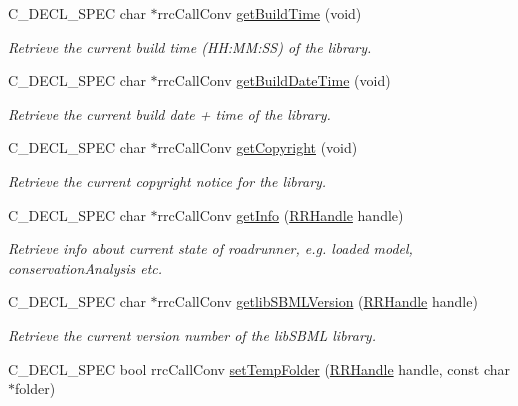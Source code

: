 \begin{DoxyCompactItemize}
C\+\_\+\+D\+E\+C\+L\+\_\+\+S\+P\+E\+C char $\ast$rrc\+Call\+Conv \hyperlink{group__utility_ga13bdcd39aaa18268a31afc060417437d}{get\+Build\+Time} (void)
\begin{DoxyCompactList}\small\item\em Retrieve the current build time (H\+H\+:\+M\+M\+:S\+S) of the library. \end{DoxyCompactList}\item 
C\+\_\+\+D\+E\+C\+L\+\_\+\+S\+P\+E\+C char $\ast$rrc\+Call\+Conv \hyperlink{group__utility_ga53e63bf5237b8e8839c5dd1fd5607e43}{get\+Build\+Date\+Time} (void)
\begin{DoxyCompactList}\small\item\em Retrieve the current build date + time of the library. \end{DoxyCompactList}\item 
C\+\_\+\+D\+E\+C\+L\+\_\+\+S\+P\+E\+C char $\ast$rrc\+Call\+Conv \hyperlink{group__utility_ga909790f456d1a032049c75013814edd2}{get\+Copyright} (void)
\begin{DoxyCompactList}\small\item\em Retrieve the current copyright notice for the library. \end{DoxyCompactList}\item 
C\+\_\+\+D\+E\+C\+L\+\_\+\+S\+P\+E\+C char $\ast$rrc\+Call\+Conv \hyperlink{group__utility_gae657705965d7a22b555f62a44d90a15f}{get\+Info} (\hyperlink{rrc__types_8h_a1d68f0592372208fa5a5f2799ea4b3ae}{R\+R\+Handle} handle)
\begin{DoxyCompactList}\small\item\em Retrieve info about current state of roadrunner, e.\+g. loaded model, conservation\+Analysis etc. \end{DoxyCompactList}\item 
C\+\_\+\+D\+E\+C\+L\+\_\+\+S\+P\+E\+C char $\ast$rrc\+Call\+Conv \hyperlink{group__utility_ga3289ab11b43ae71cb77e7d72905e4b21}{getlib\+S\+B\+M\+L\+Version} (\hyperlink{rrc__types_8h_a1d68f0592372208fa5a5f2799ea4b3ae}{R\+R\+Handle} handle)
\begin{DoxyCompactList}\small\item\em Retrieve the current version number of the lib\+S\+B\+M\+L library. \end{DoxyCompactList}\item 
C\+\_\+\+D\+E\+C\+L\+\_\+\+S\+P\+E\+C bool rrc\+Call\+Conv \hyperlink{group__utility_ga40e0e9b3f96c37bad8b0313eddf6caed}{set\+Temp\+Folder} (\hyperlink{rrc__types_8h_a1d68f0592372208fa5a5f2799ea4b3ae}{R\+R\+Handle} handle, const char $\ast$folder)

\end{DoxyCompactItemize}
